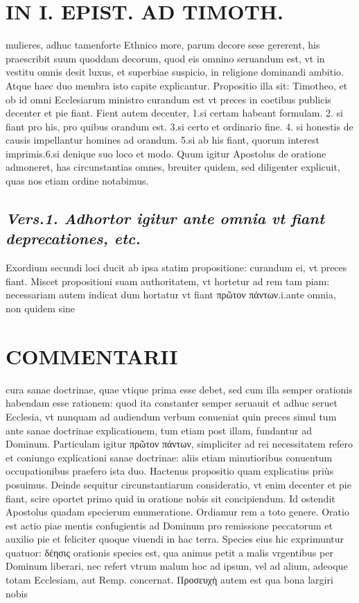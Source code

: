 \documentclass{article}
\begin{document}
\begin{pages}
\section*{IN I. EPIST. AD TIMOTH. }
\marginpar{[ p.33 ]}\pstart mulieres, adhuc tamenforte Ethnico more, parum decore sese gererent, his praescribit suum quoddam decorum, quod eis omnino seruandum est, vt in vestitu omnis desit luxus, et superbiae suspicio, in religione dominandi ambitio. Atque haec duo membra isto capite explicantur.  \pend\pstart Propositio illa sit: Timotheo, et ob id omni Ecclesiarum ministro curandum est vt preces in coetibus publicis decenter et pie fiant. Fient autem decenter, 1.si certam habeant formulam. 2. si fiant pro his, pro quibus orandum est. 3.si certo et ordinario fine. 4. si honestis de causis impellantur homines ad orandum. 5.si ab his fiant, quorum interest imprimis.6.si denique suo loco et modo.  \pend\pstart Quum igitur Apostolus de oratione admoneret, has circunstantias omnes, breuiter quidem, sed diligenter explicuit, quas nos etiam ordine notabimus.  \pend
{}
{}
\subsection*{\textit{Vers.1. Adhortor igitur ante omnia vt fiant deprecationes, etc. }}\pstart Exordium secundi loci ducit ab ipsa statim propositione: curandum ei, vt preces fiant. Miscet propositioni suam authoritatem, vt hortetur ad rem tam piam: necessariam autem indicat dum hortatur vt fiant πρῶτον πάντων.i.ante omnia, non quidem sine  \pend
\section*{COMMENTARII }
\marginpar{[ p.44 ]}\pstart cura sanae doctrinae, quae vtique prima esse debet, sed cum illa semper orationis habendam esse rationem: quod ita constanter semper seruauit et adhuc seruet Ecclesia, vt nunquam ad audiendum verbum conueniat quin preces simul tum ante sanae doctrinae explicationem, tum etiam post illam, fundantur ad Dominum. Particulam igitur πρῶτον πάντων, simpliciter ad rei necessitatem refero et coniungo explicationi sanae doctrinae: aliis etiam minutioribus conuentum occupationibus praefero ista duo. Hactenus propositio quam explicatius priùs posuimus.  \pend\pstart Deinde sequitur circunstantiarum consideratio, vt enim decenter et pie fiant, scire oportet primo quid in oratione nobis sit concipiendum. Id ostendit Apostolus quadam specierum enumeratione. Ordiamur rem a toto genere.  \pend\pstart Oratio est actio piae mentis confugientis ad Dominum pro remissione peccatorum et auxilio pie et feliciter quoque viuendi in hac terra. Species eius hic exprimuntur quatuor: δέησις orationis species est, qua animus petit a malis vrgentibus per Dominum liberari, nec refert vtrum malum hoc ad ipsum, vel ad alium, adeoque totam Ecclesiam, aut Remp. concernat. Προσευχὴ autem est qua bona largiri nobis  \pend

\end{pages}
\end{document}
